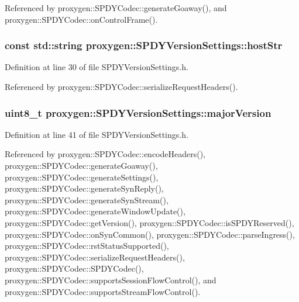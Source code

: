 Referenced by proxygen\+::\+S\+P\+D\+Y\+Codec\+::generate\+Goaway(), and proxygen\+::\+S\+P\+D\+Y\+Codec\+::on\+Control\+Frame().

\subsubsection[{host\+Str}]{\setlength{\rightskip}{0pt plus 5cm}const std\+::string proxygen\+::\+S\+P\+D\+Y\+Version\+Settings\+::host\+Str}\label{structproxygen_1_1SPDYVersionSettings_a17cdd083b02f6ae596ed485d33029b61}


Definition at line 30 of file S\+P\+D\+Y\+Version\+Settings.\+h.



Referenced by proxygen\+::\+S\+P\+D\+Y\+Codec\+::serialize\+Request\+Headers().

\subsubsection[{major\+Version}]{\setlength{\rightskip}{0pt plus 5cm}uint8\+\_\+t proxygen\+::\+S\+P\+D\+Y\+Version\+Settings\+::major\+Version}\label{structproxygen_1_1SPDYVersionSettings_a9505080269932e964debec2b57831343}


Definition at line 41 of file S\+P\+D\+Y\+Version\+Settings.\+h.



Referenced by proxygen\+::\+S\+P\+D\+Y\+Codec\+::encode\+Headers(), proxygen\+::\+S\+P\+D\+Y\+Codec\+::generate\+Goaway(), proxygen\+::\+S\+P\+D\+Y\+Codec\+::generate\+Settings(), proxygen\+::\+S\+P\+D\+Y\+Codec\+::generate\+Syn\+Reply(), proxygen\+::\+S\+P\+D\+Y\+Codec\+::generate\+Syn\+Stream(), proxygen\+::\+S\+P\+D\+Y\+Codec\+::generate\+Window\+Update(), proxygen\+::\+S\+P\+D\+Y\+Codec\+::get\+Version(), proxygen\+::\+S\+P\+D\+Y\+Codec\+::is\+S\+P\+D\+Y\+Reserved(), proxygen\+::\+S\+P\+D\+Y\+Codec\+::on\+Syn\+Common(), proxygen\+::\+S\+P\+D\+Y\+Codec\+::parse\+Ingress(), proxygen\+::\+S\+P\+D\+Y\+Codec\+::rst\+Status\+Supported(), proxygen\+::\+S\+P\+D\+Y\+Codec\+::serialize\+Request\+Headers(), proxygen\+::\+S\+P\+D\+Y\+Codec\+::\+S\+P\+D\+Y\+Codec(), proxygen\+::\+S\+P\+D\+Y\+Codec\+::supports\+Session\+Flow\+Control(), and proxygen\+::\+S\+P\+D\+Y\+Codec\+::supports\+Stream\+Flow\+Control().

